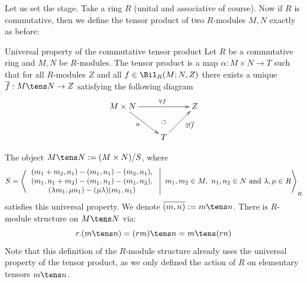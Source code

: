 \documentclass[twoside = false,	%
		headsepline,		%
		parskip = true,
		]{scrbook}						%
\begin{document}
    Let us set the stage. Take a ring $R$ (unital and associative of course). Now if $R$ is commutative, then we define the tensor product of two $R$-modules $M,N$ exactly as before:
    
    \begin{definition*}{Universal property of the commutative tensor product}{}
        Let $R$ be a commutative ring and $M,N$ be $R$-modules. The tensor product is a map $\alpha: M \times N \to T$ such that for all $R$-modules $Z$ and all $f \in \Bil_R(M;N,Z)$ there exists a unique $\overline{f}: M \tens N \to Z$ satisfying the following diagram
        \begin{equation*}
        \xymatrix {
            M \times N \ar[rr]^(.55){\forall f} \ar[dr]_(.45){\alpha}& & Z \\
            & T \ar@{}[u]|{\circlearrowleft}\ar[ur]_(.6){\exists ! \overline{f}}
        }
        \end{equation*}
    \end{definition*}
    The object $M \tens N :=(M \times N)/S$, where
        \begin{equation*}
            \begin{split}
                S = \left\langle  \left. \begin{array}{c}
                    (m_1+m_2,n_1) - (m_1,n_1) - (m_2,n_1), \\ (m_1,n_1 + m_2) - (m_1,n_1) - (m_1,n_2),  \\
                    (\lambda m_1, \mu n_1) - (\mu\lambda)( m_1, n_1) 
                \end{array}  \ \right| \ m_1,m_2 \in M, \ n_1,n_2 \in N \text{ and } \lambda,\mu \in R \right\rangle_R        
            \end{split}
        \end{equation*}
    satisfies this universal property. We denote $\overline{(m,n)}:= m \tens n$.
    There is $R$-module structure on $M \tens N$ via:
    \begin{equation*}
        r.(m \tens n) = (rm) \tens n = m \tens (rn)
    \end{equation*}
    Note that this definition of the $R$-module structure already uses the universal property of the tensor product, as we only defined the action of $R$ on elementary tensors $m \tens n$.
\end{document}
